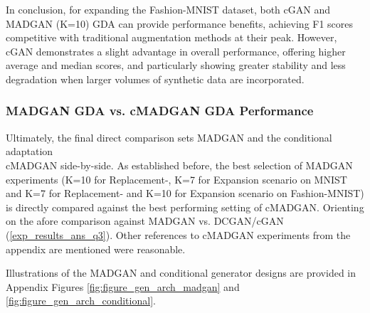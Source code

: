 In conclusion, for expanding the Fashion-MNIST dataset, both cGAN and MADGAN (K=10) GDA can provide performance benefits, achieving F1 scores competitive with traditional augmentation methods at their peak. However, cGAN demonstrates a slight advantage in overall performance, offering higher average and median scores, and particularly showing greater stability and less degradation when larger volumes of synthetic data are incorporated.

\newpage
\subsubsection[Question 4]{MADGAN GDA vs. cMADGAN GDA Performance}      \label{exp_results_ans_q4}
Ultimately, the final direct comparison sets MADGAN and the conditional adaptation \\cMADGAN side-by-side. As established before, the best selection of MADGAN experiments (K=10 for Replacement-, K=7 for Expansion scenario on MNIST and K=7 for Replacement- and K=10 for Expansion scenario on Fashion-MNIST) is directly compared against the best performing setting of cMADGAN. Orienting on the afore comparison against MADGAN vs. DCGAN/cGAN (\ref{exp_results_ans_q3}). Other references to cMADGAN experiments from the appendix are mentioned were reasonable.

Illustrations of the MADGAN and conditional generator designs are provided in Appendix Figures \ref{fig:figure_gen_arch_madgan} and \ref{fig:figure_gen_arch_conditional}.


\newpage


